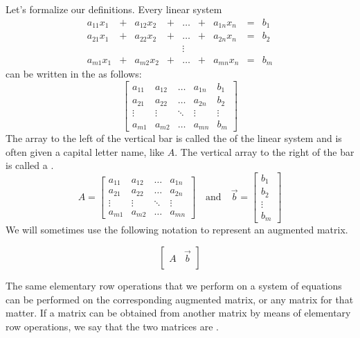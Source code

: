 \documentclass{ximera}
\begin{document}
 

\begin{remark}

  Let's formalize our definitions.  Every linear system
$$\begin{array}{ccccccccc}
      a_{11}x_1 &+ &a_{12}x_2&+&\ldots&+&a_{1n}x_n&= &b_1 \\
     a_{21}x_1 &+ &a_{22}x_2&+&\ldots&+&a_{2n}x_n&= &b_2 \\
     &&&&\vdots&&&& \\
     a_{m1}x_1 &+ &a_{m2}x_2&+&\ldots&+&a_{mn}x_n&= &b_m
    \end{array}$$
    can be written in the  as follows:
    $$\left[\begin{array}{cccc|c} 
 a_{11}&a_{12}&\ldots&a_{1n}&b_1\\a_{21}&a_{22}&\ldots&a_{2n}&b_2\\\vdots&\vdots&\ddots&\vdots&\vdots\\a_{m1}&a_{m2}&\ldots&a_{mn}&b_m
 \end{array}\right]$$
 The array to the left of the vertical bar is called the  of the linear system and is often given a capital letter name, like $A$.  The vertical array to the right of the bar is called a .
 $$A=\begin{bmatrix}a_{11}&a_{12}&\ldots&a_{1n}\\a_{21}&a_{22}&\ldots&a_{2n}\\\vdots&\vdots&\ddots&\vdots\\a_{m1}&a_{m2}&\ldots&a_{mn}\end{bmatrix}\quad\text{and}\quad\vec{b}=\begin{bmatrix}b_1\\b_2\\\vdots\\b_m\end{bmatrix}$$
We will sometimes use the following notation to represent an augmented matrix.
 
$$\left[\begin{array}{c|c} 
 A & \vec{b}\\
 \end{array}\right]$$

The same elementary row operations that we perform on a system of equations can be performed on the corresponding augmented matrix, or any matrix for that matter.  If a matrix can be obtained from another matrix by means of elementary row operations, we say that the two matrices are . 
\end{remark}
\end{document}
